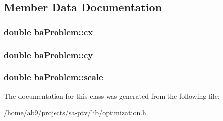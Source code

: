 \subsection{Member Data Documentation}
\hypertarget{classbaProblem_afb2b7b67d532a832a01d385d70495e58}{
\subsubsection[{cx}]{\setlength{\rightskip}{0pt plus 5cm}double ba\-Problem\-::cx}}\label{d0/d13/classbaProblem_afb2b7b67d532a832a01d385d70495e58}
\hypertarget{classbaProblem_a0715c78d9092ad7eb7e9efcd28fe77a7}{
\subsubsection[{cy}]{\setlength{\rightskip}{0pt plus 5cm}double ba\-Problem\-::cy}}\label{d0/d13/classbaProblem_a0715c78d9092ad7eb7e9efcd28fe77a7}
\hypertarget{classbaProblem_afe47c65ed856425239a6648803c98d04}{
\subsubsection[{scale}]{\setlength{\rightskip}{0pt plus 5cm}double ba\-Problem\-::scale}}\label{d0/d13/classbaProblem_afe47c65ed856425239a6648803c98d04}


The documentation for this class was generated from the following file\-:\begin{DoxyCompactItemize}
\item 
/home/ab9/projects/sa-\/ptv/lib/\hyperlink{optimization_8h}{optimization.\-h}\end{DoxyCompactItemize}
